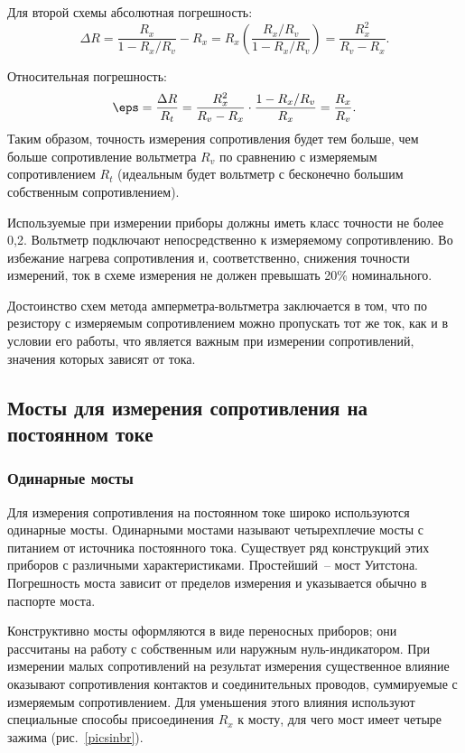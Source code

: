 \documentclass[pscyr]{hedwork}
\newcommand{\Pic}[1]{\ref{pic#1}}
\newcommand{\pic}[1]{рис.~\Pic{#1}}
\begin{document}
  Для второй схемы абсолютная погрешность:
  \[
    \Delta R = \frac{R_x}{1 - R_x / R_v} - R_x = R_x \left( \frac{R_x / R_v}
      {1 - R_x / R_v} \right) = \frac{R_x^2}{R_v - R_x}.
  \]
  
  Относительная погрешность:
  \[
    \eps = \frac{\Delta R}{R_t} = \frac{R_x^2}{R_v - R_x} \cdot
      \frac{1 - R_x / R_v}{R_x} = \frac{R_x}{R_v}.
  \]
  Таким образом, точность измерения сопротивления будет тем больше, чем больше
  сопротивление вольтметра \( R_v \) по сравнению с измеряемым сопротивлением
  \( R_t \) (идеальным будет вольтметр с бесконечно большим собственным
  сопротивлением).

  Используемые при измерении приборы должны иметь класс точности не более 0,2.
  Вольтметр подключают непосредственно к измеряемому сопротивлению. Во избежание
  нагрева сопротивления и, соответственно, снижения точности измерений, ток в
  схеме измерения не должен превышать 20\% номинального.
  
  Достоинство схем метода амперметра-вольтметра заключается в том, что по
  резистору с измеряемым сопротивлением можно пропускать тот же ток, как и в
  условии его работы, что является важным при измерении сопротивлений, значения
  которых зависят от тока.
  
  \subsection{Мосты для измерения сопротивления на постоянном токе}
  
  \subsubsection{Одинарные мосты}  
  Для измерения сопротивления на постоянном токе широко используются одинарные 
  мосты. Одинарными мостами называют четырехплечие мосты с питанием от источника
  постоянного тока. Существует ряд конструкций этих приборов с различными
  характеристиками. Простейший~-- мост Уитстона. Погрешность моста зависит от
  пределов измерения и указывается обычно в паспорте моста.
  
  Конструктивно мосты оформляются в виде переносных приборов; они рассчитаны на
  работу с собственным или наружным нуль-индикатором. При измерении малых
  сопротивлений на результат измерения существенное влияние оказывают
  сопротивления контактов и соединительных проводов, суммируемые с измеряемым
  сопротивлением. Для уменьшения этого влияния используют специальные способы
  присоединения \( R_x \) к мосту, для чего мост имеет четыре зажима
  (\pic{sinbr}).
  
\end{document}

